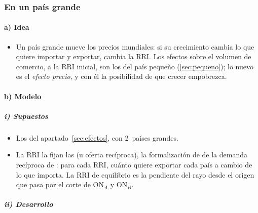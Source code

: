 \documentclass[11pt]{article}
\begin{document}
\subsubsection{En un país grande}\label{sec:grande}

\paragraph{a) Idea}

\begin{itemize}
\item Un país grande mueve los precios mundiales: si su crecimiento cambia lo que quiere importar y exportar, cambia la RRI. Los efectos sobre el volumen de comercio, a la RRI inicial, son los del país pequeño (\ref{sec:pequeno}); lo nuevo es el \emph{efecto precio}, y con él la posibilidad de que crecer empobrezca.
\end{itemize}

\paragraph{b) Modelo}

\subparagraph{i) Supuestos}

\begin{itemize}
\item Los del apartado~\ref{sec:efectos}, con 2~países grandes.
\item La RRI la fijan las  (u oferta recíproca), la formalización de \textcite{Marshall1879Pure} de la demanda recíproca de \textcite{Mill1844Essays} : para cada RRI, cuánto quiere exportar cada país a cambio de lo que importa. La RRI de equilibrio es la pendiente del rayo desde el origen que pasa por el corte de ON$_A$ y ON$_B$.
\end{itemize}

\subparagraph{ii) Desarrollo}
\end{document}
